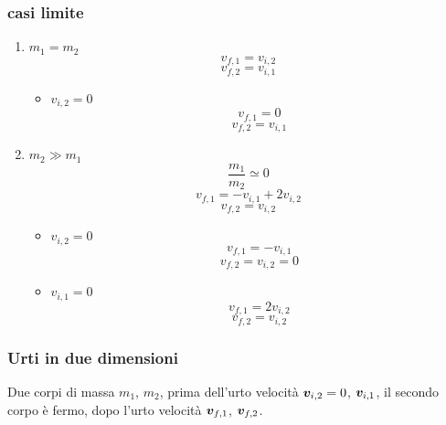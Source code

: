 \subsubsection{casi limite}
\label{casilimiteurti}
\begin{enumerate}
\item $m_1=m_2$
\begin{equation*}v_{f,1}=v_{i,2}\end{equation*}
\begin{equation*}v_{f,2}=v_{i,1}\end{equation*}
  \begin{itemize}
  \item $v_{i,2}=0$
  \begin{equation*}v_{f,1}=0\end{equation*}
  \begin{equation*}v_{f,2}=v_{i,1}\end{equation*}
  \end{itemize}
\item $m_2\gg m_1$
\begin{equation*}\frac{m_1}{m_2}\simeq 0\end{equation*}
\begin{equation*}v_{f,1}=-v_{i,1}+2v_{i,2}\end{equation*}
\begin{equation*}v_{f,2}=v_{i,2}\end{equation*}
  \begin{itemize}
  \item $v_{i,2}=0$
  \begin{equation*}v_{f,1}=-v_{i,1}\end{equation*}
  \begin{equation*}v_{f,2}=v_{i,2}=0\end{equation*}
  \item $v_{i,1}=0$
  \begin{equation*}v_{f,1}=2v_{i,2}\end{equation*}
  \begin{equation*}v_{f,2}=v_{i,2}\end{equation*}
  \end{itemize}

\end{enumerate}

\subsubsection{Urti in due dimensioni}
Due corpi di massa $m_1$, $m_2$, prima dell'urto velocità $\boldsymbol{v}_{i,2}=0$, $\boldsymbol{v}_{i,1}$, il secondo corpo è fermo, dopo l'urto velocità $\boldsymbol{v}_{f,1}$, $\boldsymbol{v}_{f,2}$.

